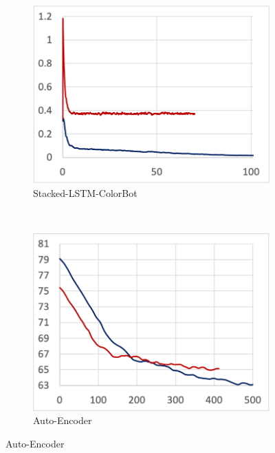 \begin{figure}[!ht]
\begin{subfigure}[t]{.24\textwidth}
    \includegraphics[width=\textwidth]{tf2-10}
    \caption{Stacked-LSTM-ColorBot}
  \end{subfigure}
  ~
  \begin{subfigure}[t]{.24\textwidth}
    \includegraphics[width=\textwidth]{tf2-11}
    \caption{Auto-Encoder}
  \end{subfigure}


\end{figure}
